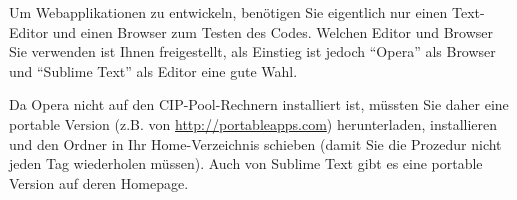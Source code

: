 %
\par Um Webapplikationen zu entwickeln, benötigen Sie eigentlich nur einen
Text-Editor und einen Browser zum Testen des Codes. Welchen Editor und Browser
Sie verwenden ist Ihnen freigestellt, als Einstieg ist jedoch ``Opera'' als
Browser und ``Sublime Text'' als Editor eine gute Wahl. 
%
\par Da Opera nicht auf den CIP-Pool-Rechnern installiert ist, müssten Sie daher
eine portable Version (z.B. von \url{http://portableapps.com}) herunterladen,
installieren und den Ordner in Ihr Home-Verzeichnis schieben (damit Sie die
Prozedur nicht jeden Tag wiederholen müssen). Auch von Sublime Text gibt es
eine portable Version auf deren Homepage.
